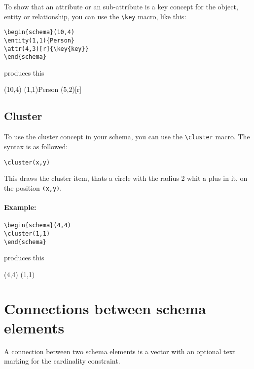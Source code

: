 \documentclass[a4paper,11pt]{article}
\begin{document}
To show that an attribute or an sub-attribute is a key concept for the object, entity or relationship,
you can use the \verb|\key| macro, like this:

\begin{verbatim}
\begin{schema}(10,4)
\entity(1,1){Person}
\attr(4,3)[r]{\key{key}}
\end{schema}
\end{verbatim}

produces this

\begin{schema}(10,4)
\entity(1,1){Person}
\attr(5,2)[r]{}
\end{schema}

\subsection{Cluster}

To use the cluster concept in your schema, you can use the \verb|\cluster| macro.
The syntax is as followed:

\begin{verbatim}
\cluster(x,y)
\end{verbatim}

This draws the cluster item, thats a circle with the radius 2 whit a plus in it, on the position 
{\tt (x,y)}.

\paragraph{Example:}

\begin{verbatim}
\begin{schema}(4,4)
\cluster(1,1)
\end{schema}

\end{verbatim}

produces this

\begin{schema}(4,4)
\cluster(1,1)
\end{schema}

\section{Connections between schema elements}

A connection between two schema elements is a vector with an optional
text marking for the cardinality constraint.
\end{document}
